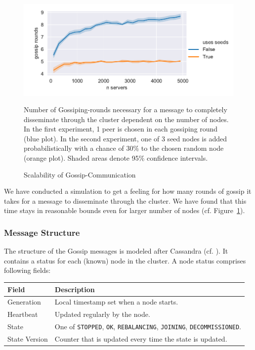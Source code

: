 \begin{figure}[]
	\centering
	\includegraphics[width=\linewidth]{resources/gossip_scaling}
	\caption{Scalability of Gossip-Communication}
	\label{fig:perf:gossip}
	{
	Number of Gossiping-rounds necessary for a message to completely disseminate
	through the cluster dependent on the number of nodes.
	In the first experiment, 1 peer is chosen in each gossiping round (blue plot).
	In the second experiment, one of 3 seed nodes is added probabilistically with a chance
	of 30\% to the chosen random node (orange plot).
	Shaded areas denote 95\% confidence intervals.
	}
\end{figure}

We have conducted a simulation to get a feeling for how many rounds of gossip it takes
for a message to disseminate through the cluster.
We have found that this time stays in reasonable bounds even for larger number of nodes (cf. Figure~\ref{fig:perf:gossip}).

\subsubsection{Message Structure}

The structure of the Gossip messages is modeled after Cassandra (cf. \cite{Brown2014}).
It contains a status for each (known) node in the cluster.
A node status comprises following fields:

\begin{table}[H]
	\begin{tabular}{@{}lp{2.5in}@{}}
		\toprule
		Field                & Description                                               \\ \midrule
		Generation           & Local timestamp set when a node starts.                                   \\
		Heartbeat            & Updated regularly by the node.                                    \\
		State                & One of \texttt{STOPPED}, \texttt{OK}, \texttt{REBALANCING}, \texttt{JOINING}, \texttt{DECOMMISSIONED}. \\
		State Version        & Counter that is updated every time the state is updated.  \\ \bottomrule
	\end{tabular}%
\end{table}

